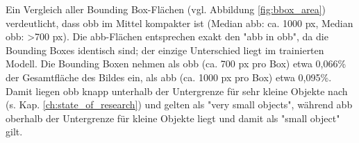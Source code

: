 Ein Vergleich aller Bounding Box-Flächen (vgl. Abbildung \ref{fig:bbox_area}) verdeutlicht, dass \acrshort{obb} im Mittel kompakter ist (Median \acrshort{abb}: ca. 1000 px, Median \acrshort{obb}: >700 px). Die \acrshort{abb}-Flächen entsprechen exakt den "abb in obb", da die Bounding Boxes identisch sind; der einzige Unterschied liegt im trainierten Modell. Die Bounding Boxen nehmen  als \acrshort{obb} (ca. 700 px pro Box) etwa 0,066\% der Gesamtfläche des Bildes ein, als \acrshort{abb} (ca. 1000 px pro Box) etwa 0,095\%. Damit liegen \acrshort{obb} knapp unterhalb der Untergrenze für sehr kleine Objekte nach \citeauthor{Chen2017} \cite{Chen2017} (s. Kap. \ref{ch:state_of_research}) und gelten als "very small objects", während \acrshort{abb} oberhalb der Untergrenze für kleine Objekte liegt und damit als "small object" gilt.



